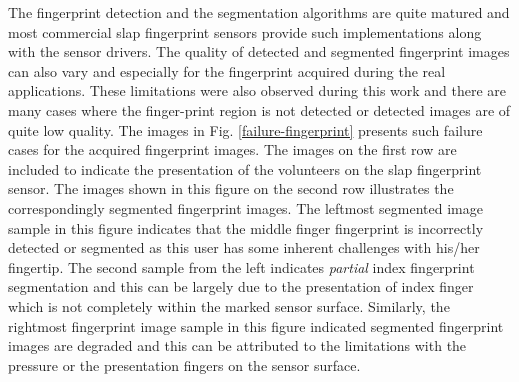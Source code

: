 The fingerprint detection and the segmentation algorithms are quite matured and most commercial slap fingerprint sensors provide such implementations along with the sensor drivers. The quality of detected and segmented fingerprint images can also vary and especially for the fingerprint acquired during the real applications. These limitations were also observed during this work and there are many cases where the finger-print region is not detected or detected images are of quite low quality. The images in Fig. \ref{failure-fingerprint} presents such failure cases for the acquired fingerprint images. The images on the first row are included to indicate the presentation of the volunteers on the slap fingerprint sensor.  The images shown in this figure on the second row illustrates the correspondingly segmented fingerprint images. The leftmost segmented image sample in this figure indicates that the middle finger fingerprint is incorrectly detected or segmented as this user has some inherent challenges with his/her fingertip. The second sample from the left indicates \textit{partial} index fingerprint segmentation and this can be largely due to the presentation of index finger which is not completely within the marked sensor surface.  Similarly, the rightmost fingerprint image sample in this figure indicated segmented fingerprint images are degraded and this can be attributed to the limitations with the pressure or the presentation fingers on the sensor surface. 